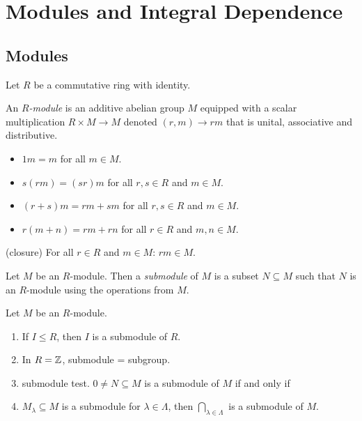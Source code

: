 \chapter{Modules and Integral Dependence}

\section{Modules}

Let $R$ be a commutative ring with identity.

\begin{definition}
    An \emph{$R$-module} is an additive abelian group $M$ equipped with a scalar multiplication $R \times M \to M$ denoted $(r,m) \to rm$ that is unital, associative and distributive.
    \begin{itemize}
        \item $1m = m$ for all $m \in M$.
        \item $s(rm) = (sr)m$ for all $r,s \in R$ and $m \in M$.
        \item $(r+s)m = rm + sm$ for all $r,s \in R$ and $m \in M$.
        \item $r(m+n) = rm + rn$ for all $r \in R$ and $m,n \in M$.
    \end{itemize}
    \quad (closure) For all $r \in R$ and $m \in M$: $rm \in M$.
\end{definition}

\begin{example}
\end{example}

\begin{definition}
    Let $M$ be an $R$-module. Then a \emph{submodule} of $M$ is a subset $N \subseteq M$ such that $N$ is an $R$-module using the operations from $M$.
\end{definition}

\noindent Let $M$ be an $R$-module.

\begin{example}
    \begin{enumerate}
        \item If $I \leq R$, then $I$ is a submodule of $R$.
        \item In $R = \mathbb{Z}$, submodule = subgroup.
        \item submodule test. $0 \neq N \subseteq M$ is a submodule of $M$ if and only if 
        \item $M_\lambda \subseteq M$ is a submodule for $\lambda \in \Lambda$, then $\bigcap_{\lambda \in \Lambda}$ is a submodule of $M$.
    \end{enumerate}
\end{example}

